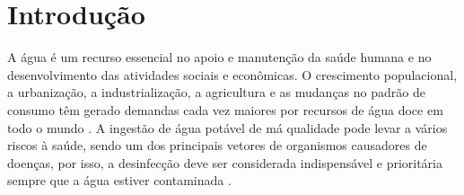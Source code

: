





\chapter{Introdução} \label{Introdução}



A água é um recurso essencial no apoio e manutenção da saúde humana e no desenvolvimento das atividades sociais e econômicas. O crescimento populacional, a urbanização, a industrialização, a agricultura e as mudanças no padrão de consumo têm gerado demandas cada vez maiores por recursos de água doce em todo o mundo \cite{UNESCO2021}. A ingestão de água potável de má qualidade pode levar a vários riscos à saúde, sendo um dos principais vetores de organismos causadores de doenças, por isso, a desinfecção deve ser considerada indispensável e prioritária sempre que a água estiver
contaminada \cite{brasila}.


